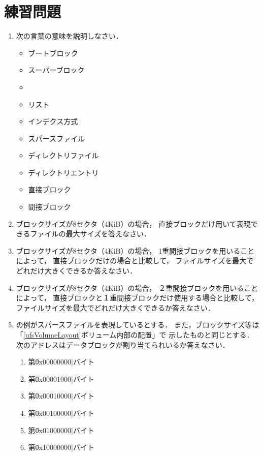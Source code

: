 \section*{練習問題}
\begin{enumerate}
\item 次の言葉の意味を説明しなさい．
  \begin{itemize}
  \item ブートブロック
  \item スーパーブロック
  \item \inode
  \item \inode リスト
  \item インデクス方式
  \item スパースファイル
  \item ディレクトリファイル
  \item ディレクトリエントリ
  \item 直接ブロック
  \item 間接ブロック
  \end{itemize}

\item ブロックサイズが8セクタ（4KiB）の場合，
  直接ブロックだけ用いて表現できるファイルの最大サイズを答えなさい．

\item ブロックサイズが8セクタ（4KiB）の場合，
  1重間接ブロックを用いることによって，
  直接ブロックだけの場合と比較して，
  ファイルサイズを最大でどれだけ大きくできるか答えなさい．

\item ブロックサイズが8セクタ（4KiB）の場合，
  ２重間接ブロックを用いることによって，
  直接ブロックと１重間接ブロックだけ使用する場合と比較して，
  ファイルサイズを最大でどれだけ大きくできるか答えなさい．

\item {}の例がスパースファイルを表現しているとする．
  また，ブロックサイズ等は「\ref{ufsVolumeLayout}ボリューム内部の配置」で
  示したものと同じとする．
  次のアドレスはデータブロックが割り当てられいるか答えなさい．

  \begin{enumerate}
    \item 第\|0x00000000|バイト
    \item 第\|0x00001000|バイト
    \item 第\|0x00010000|バイト
    \item 第\|0x00100000|バイト
    \item 第\|0x01000000|バイト
    \item 第\|0x10000000|バイト
  \end{enumerate}

\end{enumerate}
